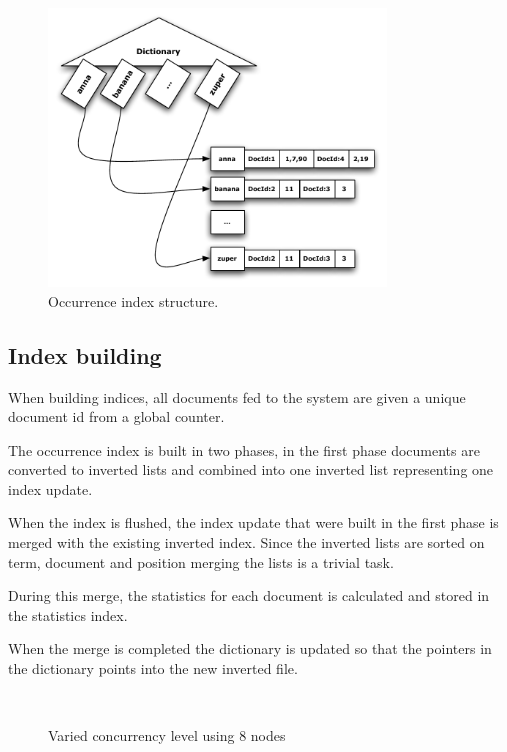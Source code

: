 \documentclass[]{article}
\begin{document}
\begin{figure}[h!!tb]
	\centering
	\includegraphics[width=0.8\textwidth]{index.pdf}
	\caption[Occurrence index structure]{Occurrence index structure.}\label{fig:occ_index_struct}
\end{figure}

\subsection{Index building}\label{sub:index_building}
When building indices, all documents fed to the system are given a unique document id from a global counter.

The occurrence index is built in two phases, in the first phase documents are converted to inverted lists and combined into one inverted list representing one index update. 

When the index is flushed, the index update that were built in the first phase is merged with the existing inverted index. Since the inverted lists are sorted on term, document and position merging the lists is a trivial task. 

During this merge, the statistics for each document is calculated and stored in the statistics index. 

When the merge is completed the dictionary is updated so that the pointers in the dictionary points into the new inverted file. 

\begin{figure}[htbp]
	\begin{center}
    \mbox{
	}
	\caption{\label{fig:res3} Varied concurrency level using 8 nodes}
	\end{center}
\end{figure}
\end{document}
